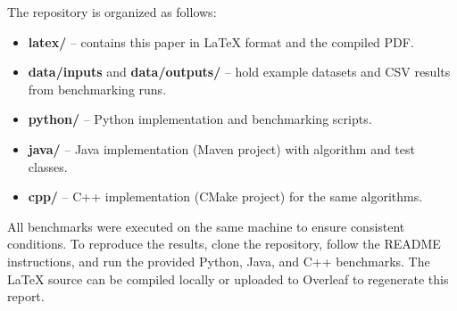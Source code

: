 \documentclass[11pt]{article}
\begin{document}
The repository is organized as follows:
\begin{itemize}
    \item \textbf{latex/} – contains this paper in \LaTeX{} format and the compiled PDF.
    \item \textbf{data/inputs} and \textbf{data/outputs/} – hold example datasets and CSV results from benchmarking runs.
    \item \textbf{python/} – Python implementation and benchmarking scripts.
    \item \textbf{java/} – Java implementation (Maven project) with algorithm and test classes.
    \item \textbf{cpp/} – C++ implementation (CMake project) for the same algorithms.
\end{itemize}

All benchmarks were executed on the same machine to ensure consistent conditions. 
To reproduce the results, clone the repository, follow the README instructions, and run the provided Python, Java, and C++ benchmarks. 
The LaTeX source can be compiled locally or uploaded to Overleaf to regenerate this report.
\end{document}

